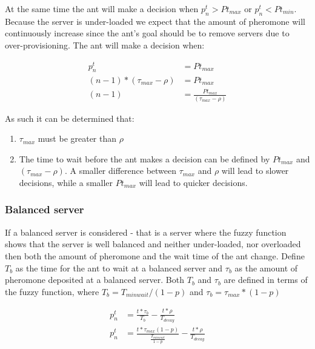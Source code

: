 At the same time the ant will make a decision when $p^{t}_{n} > Pt_{max}$ or $p^{t}_{n} < Pt_{min}$. Because the server is under-loaded we expect that the amount of pheromone will continuously increase since the ant's goal should be to remove servers due to over-provisioning. The ant will make a decision when:

\begin{equation}
\begin{aligned}
p^{t}_{n} &= Pt_{max} \\
(n - 1) * (\tau_{max} - \rho) &= Pt_{max} \\
(n - 1) &= \frac{Pt_{max}}{(\tau_{max} - \rho)} 
\end{aligned}
\end{equation}

As such it can be determined that:

\begin{enumerate}
	\item $\tau_{max}$ must be greater than $\rho$
	\item The time to wait before the ant makes a decision can be defined by $Pt_{max}$ and $(\tau_{max} - \rho)$. A smaller difference between $\tau_{max}$ and $\rho$ will lead to slower decisions, while a smaller $Pt_{max}$ will lead to quicker decisions.
\end{enumerate}

\subsubsection{Balanced server}

If a balanced server is considered - that is a server where the fuzzy function shows that the server is well balanced and neither under-loaded, nor overloaded then both the amount of pheromone and the wait time of the ant change. Define $T_{b}$ as the time for the ant to wait at a balanced server and $\tau_{b}$ as the amount of pheromone deposited at a balanced server. Both $T_{b}$ and $\tau_{b}$ are defined in terms of the fuzzy function, where $T_{b} = T_{minwait} / (1 - p)$ and $\tau_{b} = \tau_{max} * (1 - p)$

\begin{equation}
\begin{aligned}
p^{t}_{n} &= \frac{t *  \tau_{b}}{T_{b}} - \frac{t *  \rho}{T_{decay}} \\
p^{t}_{n} &= \frac{t *  \tau_{max}(1 - p)}{\frac{T_{minwait}}{1 - p}} - \frac{t *  \rho}{T_{decay}}
\end{aligned}
\end{equation}

